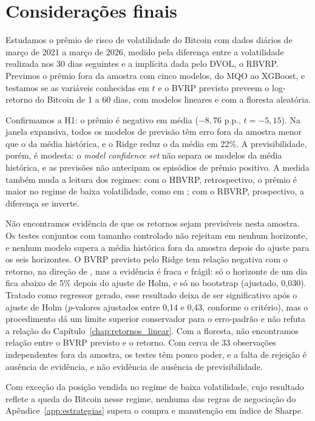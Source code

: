 \chapter{Considerações finais}
\label{chap:consideracoes_finais}

Estudamos o prêmio de risco de volatilidade do Bitcoin com dados diários de
março de 2021 a março de 2026, medido pela diferença entre a volatilidade
realizada nos 30 dias seguintes e a implícita dada pelo DVOL, o RBVRP.
Previmos o prêmio fora da amostra com cinco modelos, do MQO ao XGBoost, e
testamos se as variáveis conhecidas em $t$ e o BVRP previsto preveem o
log-retorno do Bitcoin de 1 a 60 dias, com modelos lineares e com a floresta
aleatória.

Confirmamos a H1: o prêmio é negativo em média ($-8{,}76$ p.p.,
$t = -5{,}15$). Na janela expansiva, todos os modelos de previsão têm erro fora da amostra menor que o da média
histórica, e o Ridge reduz o da média em 22\%. A previsibilidade, porém, é
modesta: o \textit{model confidence set} não separa os modelos da média
histórica, e as previsões não antecipam os episódios de prêmio positivo. A
medida também muda a leitura dos regimes: com o HBVRP, retrospectivo, o
prêmio é maior no regime de baixa volatilidade, como em
\citet{almeida2024cryptoVRP}; com o RBVRP, prospectivo, a diferença se inverte.

Não encontramos evidência de que os retornos sejam previsíveis nesta amostra.
Os testes conjuntos com
tamanho controlado não rejeitam em nenhum horizonte, e nenhum modelo supera a
média histórica fora da amostra depois do ajuste para os seis horizontes. O
BVRP previsto pelo Ridge tem relação negativa com o retorno, na direção de
\citet{bollerslev2009expected}, mas a evidência é fraca e frágil: só o
horizonte de um dia fica abaixo de 5\% depois do ajuste de Holm, e só no
bootstrap (ajustado, 0,030). Tratado como regressor gerado, esse resultado
deixa de ser significativo após o ajuste de Holm ($p$-valores ajustados entre
0,14 e 0,43, conforme o critério), mas o procedimento dá um limite superior
conservador para o erro-padrão e não refuta a relação do
Capítulo~\ref{chap:retornos_linear}. Com a floresta, não encontramos relação
entre o BVRP previsto e o retorno. Com cerca de 33 observações
independentes fora da amostra, os testes têm pouco poder, e a falta de
rejeição é ausência de evidência, e não evidência de ausência de
previsibilidade.

Com exceção da posição vendida no regime de baixa volatilidade, cujo
resultado reflete a queda do Bitcoin nesse regime, nenhuma das regras de
negociação do Apêndice~\ref{app:estrategias} supera o compra e manutenção em
índice de Sharpe.

